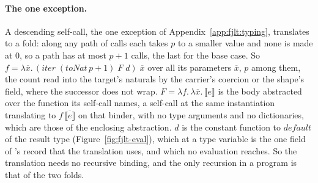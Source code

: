 \paragraph{The one exception.}
A descending self-call, the one exception of Appendix~\ref{app:fjlt:typing}, translates to a fold: along any path of calls each takes $p$ to a smaller value and none is made at $0$, so a path has at most $p + 1$ calls, the last for the base case.
So $f = \lambda\overline{x}.\, (\mathit{iter}\; (\mathit{toNat}\,p + 1)\; F\; d)\; \overline{x}$ over all its parameters $\overline{x}$, $p$ among them, the count read into the target's naturals by the carrier's coercion or the shape's field, where the successor does not wrap.
$F = \lambda f.\,\lambda\overline{x}.\,\llbracket e \rrbracket$ is the body abstracted over the function its self-call names, a self-call at the same instantiation translating to $f\,\overline{\llbracket e \rrbracket}$ on that binder, with no type arguments and no dictionaries, which are those of the enclosing abstraction.
$d$ is the constant function to $\mathit{default}$ of the result type (Figure~\ref{fig:fjlt-eval}), which at a type variable is the one field of 's record that the translation uses, and which no evaluation reaches.
So the translation needs no recursive binding, and the only recursion in a program is that of the two folds.

